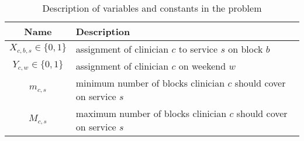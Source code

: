 \begin{table}[h]
	\centering
  \caption{Description of variables and constants in the problem}%
  \label{tbl:variables-constants}
	\begin{tabular}{ c l }
		\toprule
		\textbf{Name}              & \textbf{Description}                             
		\\ \midrule
		$X_{c, b, s} \in \{0, 1\}$ & assignment of clinician $c$ to service $s$ on
		block $b$            \\
		$Y_{c, w} \in \{0, 1\}$    & assignment of clinician $c$ on weekend $w$       
		\\
		$m_{c, s}$                 & minimum number of blocks clinician $c$ should
		cover on service $s$ \\
		$M_{c, s}$                 & maximum number of blocks clinician $c$ should
		cover on service $s$ \\
    \bottomrule
	\end{tabular}
\end{table}


